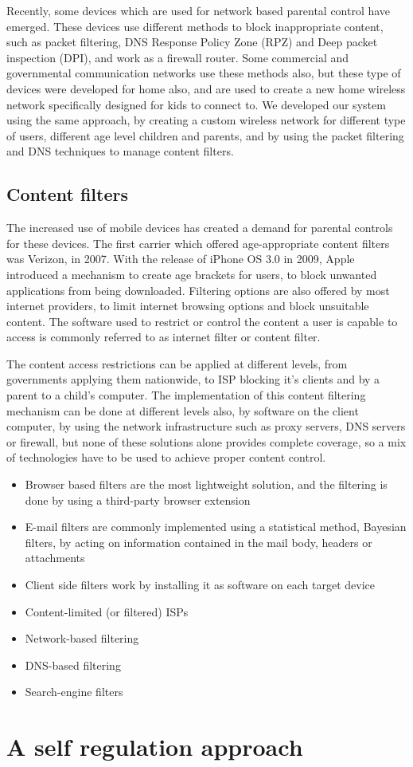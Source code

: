 Recently, some devices which are used for network based parental control have emerged. These devices use different methods to block inappropriate content, such as packet filtering, DNS Response Policy Zone (RPZ) and Deep packet inspection (DPI), and work as a firewall router. Some commercial and governmental communication networks use these methods also, but these type of devices were developed for home also, and are used to create a new home wireless network specifically designed for kids to connect to. We developed our system using the same approach, by creating a custom wireless network for different type of users, different age level children and parents, and by using the packet filtering and DNS techniques to manage content filters.

\subsection{Content filters}

The increased use of mobile devices has created a demand for parental controls for these devices. The first carrier which offered age-appropriate content filters was Verizon, in 2007. With the release of iPhone OS 3.0 in 2009, Apple introduced a mechanism to create age brackets for users, to block unwanted applications from being downloaded. Filtering options are also offered by most internet providers, to limit internet browsing options and block unsuitable content. The software used to restrict or control the content a user is capable to access is commonly referred to as internet filter or content filter.

The content access restrictions can be applied at different levels, from governments applying them nationwide, to ISP blocking it's clients and by a parent to a child's computer. The implementation of this content filtering mechanism can be done at different levels also, by software on the client computer, by using the network infrastructure such as proxy servers, DNS servers or firewall, but none of these solutions alone provides complete coverage, so a mix of technologies have to be used to achieve proper content control.

\begin{itemize}
\item Browser based filters are the most lightweight solution, and the filtering is done by using a third-party browser extension
\item E-mail filters are commonly implemented using a statistical method, Bayesian filters, by acting on information contained in the mail body, headers or attachments
\item Client side filters work by installing it as software on each target device
\item Content-limited (or filtered) ISPs
\item Network-based filtering
\item DNS-based filtering
\item Search-engine filters
\end{itemize}


\section{A self regulation approach}

